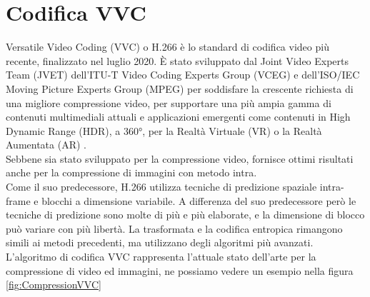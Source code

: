 \section{Codifica VVC}
Versatile Video Coding (VVC) o H.266 è lo standard di codifica video più recente, finalizzato nel luglio 2020. È stato sviluppato dal Joint Video Experts Team (JVET) dell'ITU-T Video Coding Experts Group (VCEG) e dell'ISO/IEC Moving Picture Experts Group (MPEG) per soddisfare la crescente richiesta di una migliore compressione video, per supportare una più ampia gamma di contenuti multimediali attuali e applicazioni emergenti come contenuti in High Dynamic Range (HDR), a 360°, per la Realtà Virtuale (VR) o la Realtà Aumentata (AR) \cite{9503377}.\\
Sebbene sia stato sviluppato per la compressione video, fornisce ottimi risultati anche per la compressione di immagini con metodo intra.\\
Come il suo predecessore, H.266 utilizza tecniche di predizione spaziale intra-frame e blocchi a dimensione variabile. A differenza del suo predecessore però le tecniche di predizione sono molte di più e più elaborate, e la dimensione di blocco può variare con più libertà.
La trasformata e la codifica entropica rimangono simili ai metodi precedenti, ma utilizzano degli algoritmi più avanzati.\\
L’algoritmo di codifica VVC rappresenta l’attuale stato dell’arte per la compressione di video ed immagini, ne possiamo vedere un esempio nella figura \ref{fig:CompressionVVC}
\newline

